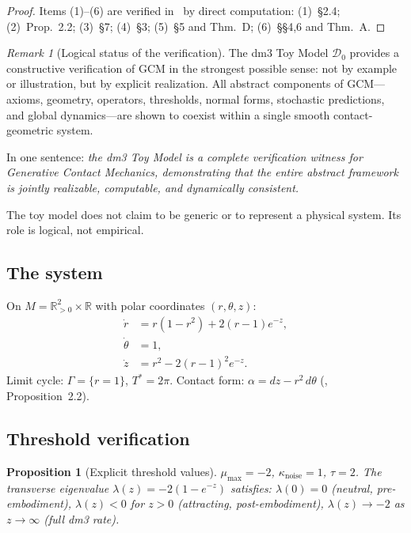 \documentclass[12pt]{article}
\numberwithin{equation}{section}
\newtheorem{proposition}[theorem]{Proposition}
\theoremstyle{remark}
\newtheorem{remark}{Remark}[section]
\newcommand{\R}{\mathbb{R}}
\newcommand{\Orb}{\Gamma}
\begin{document}
\begin{proof}
Items (1)--(6) are verified in~\cite{Paper2} by direct computation:
(1)~\S2.4; (2)~Prop.~2.2; (3)~\S7; (4)~\S3; (5)~\S5 and Thm.~D;
(6)~\S\S4,6 and Thm.~A.
\end{proof}

\begin{remark}[Logical status of the verification]
The dm3 Toy Model $\mathcal{D}_0$ provides a constructive
verification of GCM in the strongest possible sense: not by
example or illustration, but by explicit realization. All abstract
components of GCM---axioms, geometry, operators, thresholds,
normal forms, stochastic predictions, and global dynamics---are
shown to coexist within a single smooth contact-geometric system.

In one sentence: \emph{the dm3 Toy Model is a complete verification
witness for Generative Contact Mechanics, demonstrating that the
entire abstract framework is jointly realizable, computable, and
dynamically consistent.}

The toy model does not claim to be generic or to represent a
physical system. Its role is logical, not empirical.
\end{remark}

\subsection{The system}
\label{subsec:system}

On $M=\R^2_{>0}\times\R$ with polar coordinates $(r,\theta,z)$:
\begin{align}
  \dot r &= r(1-r^2)+2(r-1)e^{-z},\label{eq:rdot}\\
  \dot\theta &= 1,\label{eq:tdot}\\
  \dot z &= r^2 - 2(r-1)^2 e^{-z}.\label{eq:zdot}
\end{align}
Limit cycle: $\Orb=\{r=1\}$, $T^*=2\pi$.
Contact form: $\alpha=dz-r^2\,d\theta$
(\cite{Paper2}, Proposition~2.2).

\subsection{Threshold verification}

\begin{proposition}[Explicit threshold values]
\label{prop:explicit}
$\mu_{\max}=-2$, $\kappa_{\mathrm{noise}}=1$, $\tau=2$.
The transverse eigenvalue $\lambda(z)=-2(1-e^{-z})$ satisfies:
$\lambda(0)=0$ (neutral, pre-embodiment),
$\lambda(z)<0$ for $z>0$ (attracting, post-embodiment),
$\lambda(z)\to -2$ as $z\to\infty$ (full dm3 rate).
\end{proposition}
\end{document}
